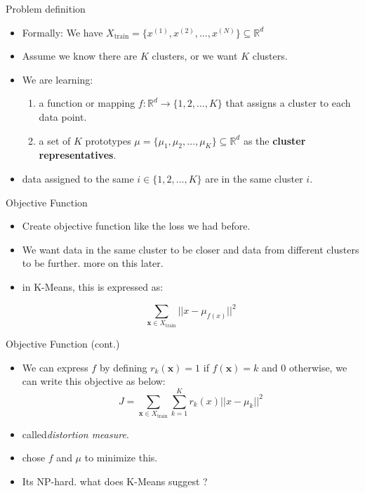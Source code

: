 \documentclass[serif, aspectratio=169]{beamer}
\begin{document}
\begin{frame}{Problem definition}
    \begin{itemize}
        \item Formally: We have $X_{\text{train}} = \{ x^{(1)}, x^{(2)}, \dots, x^{(N)} \} \subseteq \mathbb{R}^d$
        \item Assume we know there are $K$ clusters, or we want $K$ clusters.
        \item We are learning:
        \begin{enumerate}
            \item a function or mapping $f:\mathbb{R}^d\to \{1,2, \dots , K\}$ that assigns a cluster to each data point.
            \item a set of \( K \) prototypes \(\mu = \{ \mu_1, \mu_2, \dots, \mu_K  \} \subseteq \mathbb{R}^d \) as the \textbf{cluster representatives}.
        \end{enumerate}
        \item data assigned to the same $i \in \{1,2, \dots , K\}$ are in the same cluster $i$.
    \end{itemize}
\end{frame}

\begin{frame}{Objective Function}
\begin{itemize}
    
    \item Create objective function like the loss we had before.
    \item We want data in the same cluster to be closer and data from different clusters to be further. more on this later.
    \item in K-Means, this is expressed as:

    $$
    \sum_{\mathbf{x} \in X_{\text{train}}} || x -  \mu_{f(x)} ||^2
    $$
    
\end{itemize}
\end{frame}


\begin{frame}{Objective Function (cont.)}
    \begin{itemize}
        
        \item We can express $f$ by defining $r_k(\mathbf{x}) = 1$ if $f(\mathbf{x}) = k$ and $0$ otherwise, we can write this objective as below:
$$
J = \sum_{\mathbf{x} \in X_{\text{train}}} \sum_{k=1}^{K} r_k(x)|| x -  \mu_k ||^2
$$
        \item called\textit{distortion measure}.
        \item chose $f$ and $\mu$ to minimize this.
        \item Its NP-hard. what does K-Means suggest ?
      
    \end{itemize}
\end{frame}
\end{document}
